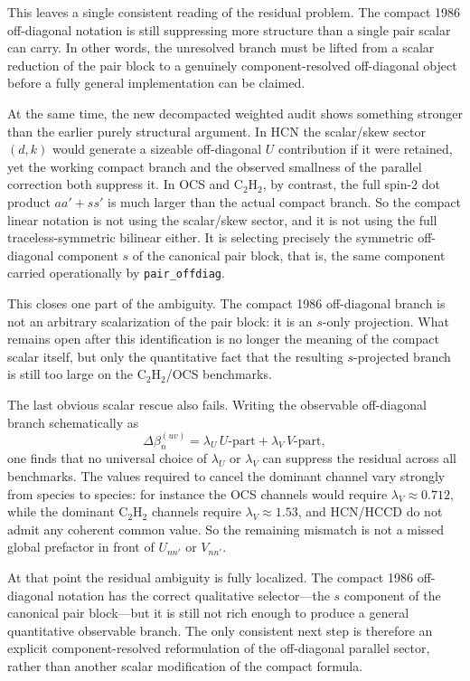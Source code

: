 \documentclass[11pt]{article}
\begin{document}
This leaves a single consistent reading of the residual problem. The compact
1986 off-diagonal notation is still suppressing more structure than a single
pair scalar can carry. In other words, the unresolved branch must be lifted
from a scalar reduction of the pair block to a genuinely component-resolved
off-diagonal object before a fully general implementation can be claimed.

At the same time, the new decompacted weighted audit shows something stronger
than the earlier purely structural argument. In HCN the scalar/skew sector
$(d,k)$ would generate a sizeable off-diagonal $U$ contribution if it were
retained, yet the working compact branch and the observed smallness of the
parallel correction both suppress it. In OCS and C$_2$H$_2$, by contrast, the
full spin-2 dot product $a a'+s s'$ is much larger than the actual compact
branch. So the compact linear notation is not using the scalar/skew sector, and
it is not using the full traceless-symmetric bilinear either. It is selecting
precisely the symmetric off-diagonal component $s$ of the canonical pair block,
that is, the same component carried operationally by \texttt{pair\_offdiag}.

This closes one part of the ambiguity. The compact 1986 off-diagonal branch is
not an arbitrary scalarization of the pair block: it is an $s$-only
projection. What remains open after this identification is no longer the
meaning of the compact scalar itself, but only the quantitative fact that the
resulting $s$-projected branch is still too large on the C$_2$H$_2$/OCS
benchmarks.

The last obvious scalar rescue also fails. Writing the observable off-diagonal
branch schematically as
\[
\Delta\beta_n^{(uv)}=\lambda_U\,U\text{-part}+\lambda_V\,V\text{-part},
\]
one finds that no universal choice of $\lambda_U$ or $\lambda_V$ can suppress
the residual across all benchmarks. The values required to cancel the dominant
channel vary strongly from species to species: for instance the OCS channels
would require $\lambda_V\approx0.712$, while the dominant
C$_2$H$_2$ channels require $\lambda_V\approx1.53$, and HCN/HCCD do not admit
any coherent common value. So the remaining mismatch is not a missed global
prefactor in front of $U_{nn'}$ or $V_{nn'}$.

At that point the residual ambiguity is fully localized. The compact 1986
off-diagonal notation has the correct qualitative selector---the $s$ component
of the canonical pair block---but it is still not rich enough to produce a
general quantitative observable branch. The only consistent next step is
therefore an explicit component-resolved reformulation of the off-diagonal
parallel sector, rather than another scalar modification of the compact
formula.
\end{document}
